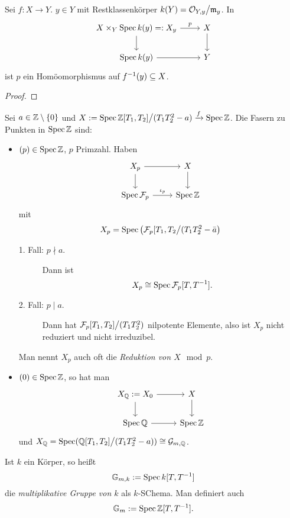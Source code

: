\begin{lemma}
    Sei $f:X \to Y$. $y\in Y$ mit Restklassenkörper $k(Y) = \mathcal{O}_{Y,y}\big/\mathfrak{m}_y$.
    In
    \[\begin{tikzcd}
        X \times_Y \Spec k(y) =: X_y \rar{p} \dar & X \dar\\
        \Spec k(y) \rar & Y
    \end{tikzcd}\]
    ist $p$ ein Homöomorphismus auf $f^{-1}(y) \subseteq X$.
\end{lemma}
\begin{proof}
    \TODO
\end{proof}


\begin{beispiel}
    Sei $a \in \mathbb{Z} \setminus\{0\}$ und 
    $X := \operatorname{Spec}\mathbb{Z}[T_1,T_2] \big/ (T_1T_2^2-a) \xrightarrow{f} \operatorname{Spec} \mathbb{Z}$. 
    Die Fasern zu Punkten in $\operatorname{Spec} \mathbb{Z}$ sind:
    \begin{itemize}
      \item $(p) \in \operatorname{Spec}\mathbb{Z}$, $p$ Primzahl. Haben
        \[\begin{tikzcd}
            X_p \dar \rar  
                & X \dar\\
            \Spec\F_p \rar{\iota_p} 
                & \Spec \Z 
        \end{tikzcd}\]
        mit
        \[X_p = \operatorname{Spec}\left(\mathcal{F}_p[T_1,T_2 \big/ (T_1T_2^2 - \bar a\right)\]
        \begin{description}
        \item[1. Fall: $p\nmid a$.] Dann ist
            \[X_p \cong \operatorname{Spec} \mathcal{F}_p[T,T^{-1}].\]
        \item[2. Fall: $p \mid a$.] Dann hat $\mathcal{F}_p[T_1,T_2]\big/(T_1T_2^2)$
            nilpotente Elemente, also ist $X_p$ nicht reduziert und 
            nicht irreduzibel.
        \end{description}
        Man nennt $X_p$ auch oft die \emph{Reduktion von $X \mod p$}.
        \item $(0)\in \operatorname{Spec}\mathbb{Z}$, so hat man
            \[\begin{tikzcd}
                X_\Q := X_0 \dar \rar  
                    & X \dar\\
                \Spec\Q \rar 
                    & \Spec \Z 
            \end{tikzcd}\]
            und $X_\mathbb{Q} = \operatorname{Spec}(\mathbb{Q}[T_1,T_2]\big/(T_1T_2^2 - a)) \cong \mathcal{G}_{m,\mathbb{Q}}$.
    \end{itemize}
\end{beispiel}

\begin{definition}
    Ist $k$ ein Körper, so heißt
    \[\mathbb{G}_{m,k} := \operatorname{Spec} k[T,T^{-1}]\]
    die \emph{multiplikative Gruppe von $k$} als $k$-SChema.
    Man definiert auch
    \[\mathbb{G}_m := \operatorname{Spec} \mathbb{Z}[T,T^{-1}].\]
\end{definition}

